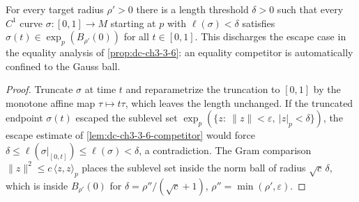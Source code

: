\begin{lemma}
  \label{lem:dc-ch3-3-6-confinement}
  \leanok
  For every target radius $\rho'>0$ there is a length threshold $\delta>0$
  such that every $C^1$ curve $\sigma:[0,1]\to M$ starting at $p$ with
  $\ell(\sigma)<\delta$ satisfies $\sigma(t)\in\exp_p(B_{\rho'}(0))$ for all
  $t\in[0,1]$. This discharges the escape case in the equality analysis of
  \cref{prop:dc-ch3-3-6}: an equality competitor is automatically confined
  to the Gauss ball.
\end{lemma}
\begin{proof}
  \sketch
  \leanok
  Truncate $\sigma$ at time $t$ and reparametrize the truncation to $[0,1]$
  by the monotone affine map $\tau\mapsto t\tau$, which leaves the length
  unchanged. If the truncated endpoint $\sigma(t)$ escaped the sublevel set
  $\exp_p(\{z:\ \|z\|<\varepsilon,\ |z|_p<\delta\})$, the escape estimate of
  \cref{lem:dc-ch3-3-6-competitor} would force
  $\delta\le\ell(\sigma|_{[0,t]})\le\ell(\sigma)<\delta$, a contradiction.
  The Gram comparison $\|z\|^2\le c\,\langle z,z\rangle_p$ places the
  sublevel set inside the norm ball of radius $\sqrt{c}\,\delta$, which is
  inside $B_{\rho'}(0)$ for $\delta=\rho''/(\sqrt{c}+1)$,
  $\rho''=\min(\rho',\varepsilon)$.
\end{proof}

